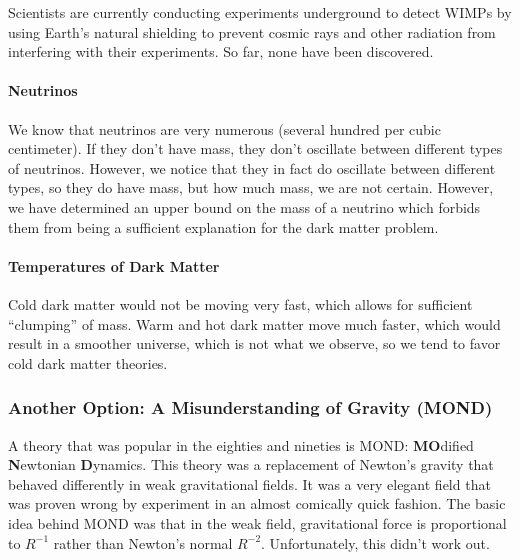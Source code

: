 \documentclass{article}
\begin{document}
	\noindent Scientists are currently conducting experiments underground to detect WIMPs by using Earth's natural shielding to prevent cosmic rays and other radiation from interfering with their experiments. So far, none have been discovered.
	
	\paragraph{Neutrinos} We know that neutrinos are very numerous (several hundred per cubic centimeter). If they don't have mass, they don't oscillate between different types of neutrinos. However, we notice that they in fact do oscillate between different types, so they do have mass, but how much mass, we are not certain. However, we have determined an upper bound on the mass of a neutrino which forbids them from being a sufficient explanation for the dark matter problem.
	\paragraph{Temperatures of Dark Matter} Cold dark matter would not be moving very fast, which allows for sufficient ``clumping'' of mass. Warm and hot dark matter move much faster, which would result in a smoother universe, which is not what we observe, so we tend to favor cold dark matter theories.
	\subsubsection{Another Option: A Misunderstanding of Gravity (MOND)} A theory that was popular in the eighties and nineties is MOND: \textbf{MO}dified \textbf{N}ewtonian \textbf{D}ynamics. This theory was a replacement of Newton's gravity that behaved differently in weak gravitational fields. It was a very elegant field that was proven wrong by experiment in an almost comically quick fashion. The basic idea behind MOND was that in the weak field, gravitational force is proportional to $R^{-1}$ rather than Newton's normal $R^{-2}$. Unfortunately, this didn't work out.
\end{document}
